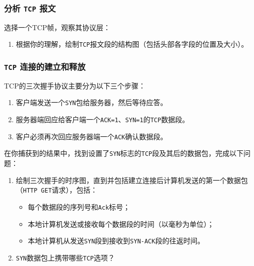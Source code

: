 \documentclass{article}
\begin{document}
\subsubsection{分析 \texttt{TCP} 报文}

选择一个TCP帧，观察其协议层：

\begin{enumerate}[noitemsep]
  \item 根据你的理解，绘制\texttt{TCP}报文段的结构图（包括头部各字段的位置及大小）。
\end{enumerate}

\subsubsection{\texttt{TCP} 连接的建立和释放}

TCP的三次握手协议主要分为以下三个步骤：
\begin{enumerate}[noitemsep]
  \item 客户端发送一个\texttt{SYN}包给服务器，然后等待应答。
  \item 服务器端回应给客户端一个\texttt{ACK=1}、\texttt{SYN=1}的\texttt{TCP}数据段。
  \item 客户必须再次回应服务器端一个\texttt{ACK}确认数据段。
\end{enumerate}

在你捕获到的结果中，找到设置了\texttt{SYN}标志的\texttt{TCP}段及其后的数据包，完成以下问题： 

\begin{enumerate}[noitemsep]
  \item 绘制三次握手的时序图，直到并包括建立连接后计算机发送的第一个数据包（\texttt{HTTP GET}请求），包括：
  \begin{itemize}
  	\item 每个数据段的序列号和\texttt{Ack}标号；
  	\item 本地计算机发送或接收每个数据段的时间（以毫秒为单位）；
  	\item 本地计算机从发送\texttt{SYN}段到接收到\texttt{SYN-ACK}段的往返时间。
  \end{itemize}
  \item \texttt{SYN}数据包上携带哪些\texttt{TCP}选项？
\end{enumerate}
\end{document}
